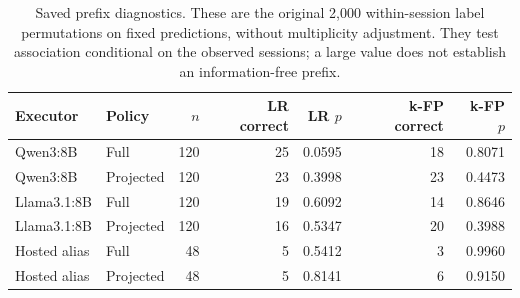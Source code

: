 \begin{table}[t]\centering\small
\caption{Saved prefix diagnostics. These are the original 2,000 within-session label permutations on fixed predictions, without multiplicity adjustment. They test association conditional on the observed sessions; a large value does not establish an information-free prefix.}\label{tab:prefix-diagnostics}
\setlength{\tabcolsep}{3pt}
\begin{tabularx}{\textwidth}{@{}lYrrrrr@{}}\toprule
Executor & Policy & $n$ & LR correct & LR $p$ & k-FP correct & k-FP $p$ \\\midrule
Qwen3:8B & Full & 120 & 25 & 0.0595 & 18 & 0.8071 \\
Qwen3:8B & Projected & 120 & 23 & 0.3998 & 23 & 0.4473 \\
Llama3.1:8B & Full & 120 & 19 & 0.6092 & 14 & 0.8646 \\
Llama3.1:8B & Projected & 120 & 16 & 0.5347 & 20 & 0.3988 \\
Hosted alias & Full & 48 & 5 & 0.5412 & 3 & 0.9960 \\
Hosted alias & Projected & 48 & 5 & 0.8141 & 6 & 0.9150 \\
\bottomrule\end{tabularx}
\end{table}
